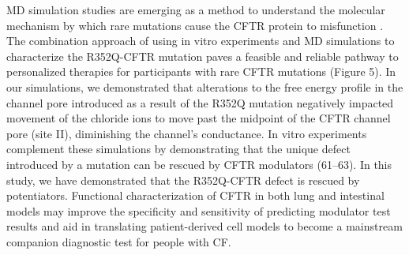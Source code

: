 MD simulation studies are emerging as a method to understand the molecular mechanism by which rare mutations cause the CFTR protein to misfunction \cite{callebaut2017}. The combination approach of using in vitro experiments and MD simulations to characterize the R352Q-CFTR mutation paves a feasible and reliable pathway to personalized therapies for participants with rare CFTR mutations (Figure 5). In our simulations, we demonstrated that alterations to the free energy profile in the channel pore introduced as a result of the R352Q mutation negatively impacted movement of the chloride ions to move past the midpoint of the CFTR channel pore (site II), diminishing the channel’s conductance. In vitro experiments complement these simulations by demonstrating that the unique defect introduced by a mutation can be rescued by CFTR modulators (61–63). In this study, we have demonstrated that the R352Q-CFTR defect is rescued by potentiators. Functional characterization of CFTR in both lung and intestinal models may improve the specificity and sensitivity of predicting modulator test results and aid in translating patient-derived cell models to become a mainstream companion diagnostic test for people with CF.

